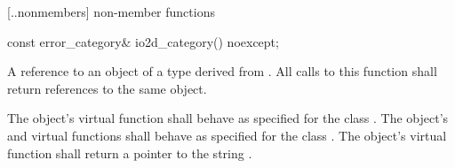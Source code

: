  [\iotwod.\iotwoderrorcategory.nonmembers] { 
non-member functions}

\begin{itemdecl}
  const error_category& io2d_category() noexcept;
\end{itemdecl}
\begin{itemdescr}
	\pnum
	\returns
	A reference to an object of a type derived from . All 
	calls to this function shall return references to the same object.
	
	\pnum
	\remarks
	The object's  virtual function shall behave 
	as specified for the class . The object's 
	 and  
	virtual functions shall behave as specified for the class 
	. The object's  virtual function 
	shall return a pointer to the string .
\end{itemdescr}
